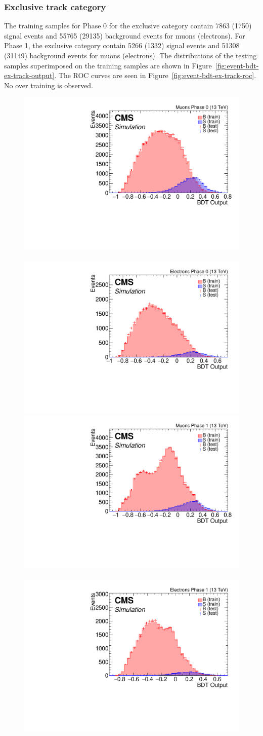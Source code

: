 \clearpage
\subsubsection{Exclusive track category}

The training samples for Phase 0 for the exclusive  category contain 7863 (1750) signal events and 55765 (29135) background events for muons (electrons). For Phase 1, the exclusive category contain 5266 (1332) signal events and 51308 (31149) background events for muons (electrons). The distributions of the testing samples superimposed on the training samples are shown in Figure~\ref{fig:event-bdt-ex-track-output}. The ROC curves are seen in Figure~\ref{fig:event-bdt-ex-track-roc}. No over training is observed.

\begin{figure}[!htb]
\centering
\includegraphics[width=0.48\linewidth]{plots/extrack_bdt/overtraining_Event_Ex_Track_Muons_Phase_0.pdf} \,
\includegraphics[width=0.48\linewidth]{plots/extrack_bdt/overtraining_Event_Ex_Track_Electrons_Phase_0.pdf} \\

\includegraphics[width=0.48\linewidth]{plots/extrack_bdt/overtraining_Event_Ex_Track_Muons_Phase_1.pdf} \,
\includegraphics[width=0.48\linewidth]{plots/extrack_bdt/overtraining_Event_Ex_Track_Electrons_Phase_1.pdf} \\


\end{figure}

